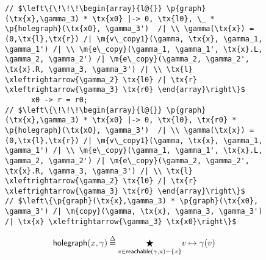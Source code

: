 \begin{figure}
  \begin{lstlisting}
// $\left\{\!\!\!\begin{array}{l@{}} \p{graph}(\tx{x},\gamma_3) * \tx{x0} |-> 0, \tx{l0}, \_ * \p{holegraph}(\tx{x0}, \gamma_3')  /| \\ \gamma(\tx{x}) = (0,\tx{l},\tx{r}) /| \m{v\_copy1}(\gamma, \tx{x}, \gamma_1, \gamma_1') /| \\ \m{e\_copy}(\gamma_1, \gamma_1', \tx{x}.L, \gamma_2, \gamma_2') /| \m{e\_copy}(\gamma_2, \gamma_2', \tx{x}.R, \gamma_3, \gamma_3') /| \\ \tx{l} \xleftrightarrow{\gamma_2} \tx{l0} /| \tx{r} \xleftrightarrow{\gamma_3} \tx{r0} \end{array}\right\}$
      x0 -> r = r0;
// $\left\{\!\!\!\begin{array}{l@{}} \p{graph}(\tx{x},\gamma_3) * \tx{x0} |-> 0, \tx{l0}, \tx{r0} * \p{holegraph}(\tx{x0}, \gamma_3')  /| \\ \gamma(\tx{x}) = (0,\tx{l},\tx{r}) /| \m{v\_copy1}(\gamma, \tx{x}, \gamma_1, \gamma_1') /| \\ \m{e\_copy}(\gamma_1, \gamma_1', \tx{x}.L, \gamma_2, \gamma_2') /| \m{e\_copy}(\gamma_2, \gamma_2', \tx{x}.R, \gamma_3, \gamma_3') /| \\ \tx{l} \xleftrightarrow{\gamma_2} \tx{l0} /| \tx{r} \xleftrightarrow{\gamma_3} \tx{r0} \end{array}\right\}$
// $\left\{\p{graph}(\tx{x},\gamma_3) * \p{graph}(\tx{x0}, \gamma_3') /| \m{copy}(\gamma, \tx{x}, \gamma_3, \gamma_3') /| \tx{x} \xleftrightarrow{\gamma_3} \tx{x0}\right\}$
  \end{lstlisting}
  \small
\begin{gather*}
  \p{holegraph}(x, \gamma)\defeq \underset{v\in\p{reachable}(\gamma, \tx x) - \{x\}}{\bigstar}v \mapsto \gamma(v)\\

\end{gather*}
\end{figure}
